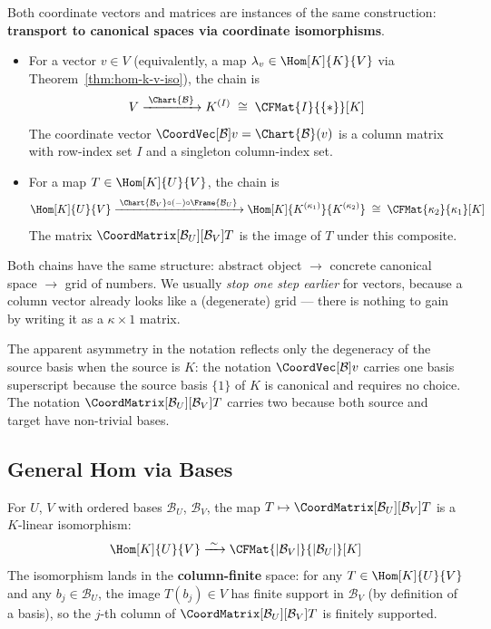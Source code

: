 \begin{remark}
    Both coordinate vectors and matrices are instances of the same construction:
    \textbf{transport to canonical spaces via coordinate isomorphisms}.
    \begin{itemize}
        \item For a vector $v \in V$ (equivalently, a map
              $\lambda_v \in \Hom[K]{K}{V}$ via Theorem~\ref{thm:hom-k-v-iso}),
              the chain is
              \[
                  V \xrightarrow{\;\Chart{\mathcal{B}}\;} K^{(I)}
                  \;\cong\; \CFMat{I}{\{*\}}[K]
              \]
              The coordinate vector $\CoordVec[\mathcal{B}]{v} = \Chart{\mathcal{B}}(v)$
              is a column matrix with row-index set $I$ and a singleton column-index set.
        \item For a map $T \in \Hom[K]{U}{V}$, the chain is
              \[
                  \Hom[K]{U}{V}
                  \xrightarrow{\;\Chart{\mathcal{B}_V} \circ (-) \circ
                  \Frame{\mathcal{B}_U}\;}
                  \Hom[K]{K^{(\kappa_1)}}{K^{(\kappa_2)}}
                  \;\cong\; \CFMat{\kappa_2}{\kappa_1}[K]
              \]
              The matrix
              $\CoordMatrix[\mathcal{B}_U][\mathcal{B}_V]{T}$
              is the image of $T$ under this composite.
    \end{itemize}
    Both chains have the same structure: abstract object $\to$ concrete canonical
    space $\to$ grid of numbers. We usually \emph{stop one step earlier} for vectors,
    because a column vector already looks like a (degenerate) grid --- there is nothing to
    gain by writing it as a $\kappa \times 1$ matrix.

    The apparent asymmetry in the notation reflects only the degeneracy of the source basis
    when the source is $K$: the notation $\CoordVec[\mathcal{B}]{v}$ carries one basis
    superscript because the source basis $\{1\}$ of $K$ is canonical and requires no choice.
    The notation $\CoordMatrix[\mathcal{B}_U][\mathcal{B}_V]{T}$ carries two because both
    source and target have non-trivial bases.
\end{remark}

\subsection{General Hom via Bases}

\begin{theorem}
\label{thm:hom-cfmat}
    For $U$, $V$ with ordered bases $\mathcal{B}_U$, $\mathcal{B}_V$, the map
    $T \mapsto \CoordMatrix[\mathcal{B}_U][\mathcal{B}_V]{T}$ is a $K$-linear isomorphism:
    \[
        \Hom[K]{U}{V} \xrightarrow{\;\sim\;}
        \CFMat{|\mathcal{B}_V|}{|\mathcal{B}_U|}[K]
    \]
    The isomorphism lands in the \textbf{column-finite} space: for any
    $T \in \Hom[K]{U}{V}$ and any $b_j \in \mathcal{B}_U$, the image $T(b_j) \in V$ has
    finite support in $\mathcal{B}_V$ (by definition of a basis), so the $j$-th column of
    $\CoordMatrix[\mathcal{B}_U][\mathcal{B}_V]{T}$ is finitely supported.
\end{theorem}

